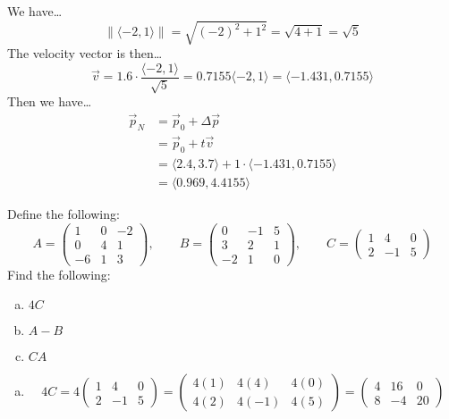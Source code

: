 \documentclass[12pt,letterpaper]{exam}
\begin{document}
\begin{questions}
\sol We have\dots
	\[
	\| \langle -2, 1 \rangle \|= \sqrt{(-2)^2 + 1^2}= \sqrt{4 + 1}= \sqrt{5}
	\]
The velocity vector is then\dots
	\[
	\vec{v}= 1.6 \cdot \dfrac{\langle -2, 1 \rangle}{\sqrt{5}}= 0.7155 \langle -2, 1 \rangle= \langle -1.431, 0.7155 \rangle 
	\]
Then we have\dots
	\[
	\begin{aligned}
	\vec{p}_N&= \vec{p}_0 + \Delta \vec{p} \\[0.3cm]
	&= \vec{p}_0 + t \vec{v} \\[0.3cm]
	&= \langle 2.4, 3.7 \rangle + 1 \cdot \langle -1.431, 0.7155 \rangle \\[0.3cm]
	&= \langle 0.969, 4.4155 \rangle 
	\end{aligned}
	\]



\newpage
\question[10] Define the following:
	\[
	A= 
	\begin{pmatrix}
	1 & 0 & -2 \\
	0 & 4 & 1 \\
	-6 & 1 & 3
	\end{pmatrix},
	\qquad
	B= 
	\begin{pmatrix}
	0 & -1 & 5 \\
	3 & 2 & 1 \\
	-2 & 1 & 0 
	\end{pmatrix},
	\qquad
	C= 
	\begin{pmatrix}
	1 & 4 & 0 \\
	2 & -1 & 5 
	\end{pmatrix}
	\]
Find the following:
	\begin{enumerate}[(a)]
	\item $4C$
	\item $A - B$
	\item $CA$
	\end{enumerate} \pspace

\sol 
\begin{enumerate}[(a)]
\item 
	\[
	4C=
	4 
	\begin{pmatrix}
	1 & 4 & 0 \\
	2 & -1 & 5 
	\end{pmatrix}= 
	\begin{pmatrix}
	4(1) & 4(4) & 4(0) \\
	4(2) & 4(-1) & 4(5) 
	\end{pmatrix}=
	\begin{pmatrix}
	4 & 16 & 0 \\
	8 & -4 & 20 
	\end{pmatrix}
	\] \pspace


\end{enumerate}
\end{questions}
\end{document}
